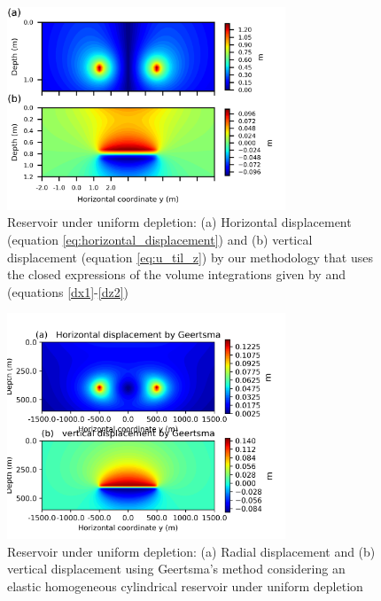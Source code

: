 \documentclass[journal abbreviation, manuscript]{copernicus}
\begin{document}
\begin{figure}[h]
\includegraphics[width=8.3cm]{Fig/Figure_Displacement.png}
\caption{Reservoir under uniform depletion: (a) Horizontal displacement (equation \ref{eq:horizontal_displacement}) and (b) vertical displacement (equation \ref{eq:u_til_z}) by our methodology that uses the closed expressions of the volume integrations given by \cite{Nagyetal2000} and \cite{Nagyetal2002} (equations \ref{dx1}-\ref{dz2})}
\label{fig:displacement}
\end{figure}

\begin{figure}[h]
\includegraphics[width=8.3cm]{Fig/Figure_Displacement_Geertsma.png}
\caption{Reservoir under uniform depletion: (a) Radial displacement and (b) vertical displacement using Geertsma’s method \citep{Geertsma73}  considering an elastic homogeneous cylindrical reservoir under uniform depletion \citep{Fjaer08}}
\label{fig:displacement_Geertsma}
\end{figure}
\end{document}
